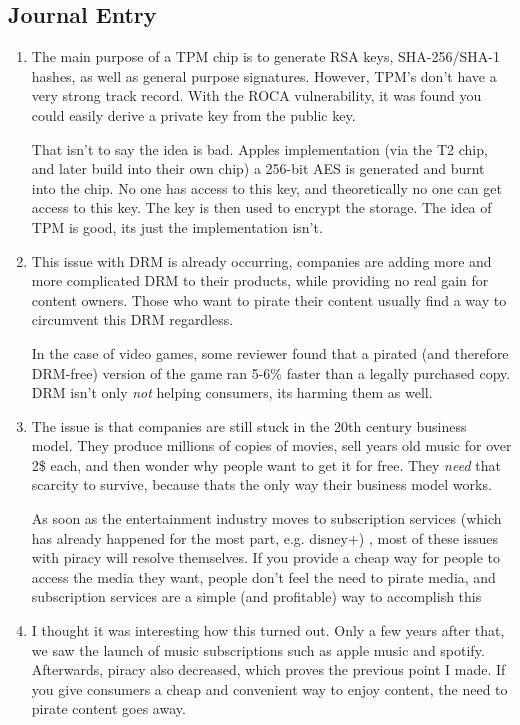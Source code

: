 \documentclass{scrartcl}
\begin{document}
\subsection{Journal Entry}
\label{sec:orgf8aa1bc}
\begin{enumerate}
\item The main purpose of a TPM chip is to generate RSA keys, SHA-256/SHA-1 hashes,
as well as general purpose signatures. However, TPM's don't have a very
strong track record. With the ROCA vulnerability, it was found you could
easily derive a private key from the public key.

That isn't to say the idea is bad. Apples implementation (via the T2 chip,
and later build into their own chip) a 256-bit AES is generated and burnt
into the chip. No one has access to this key, and theoretically no one can
get access to this key. The key is then used to encrypt the storage. The idea
of TPM is good, its just the implementation isn't.

\item This issue with DRM is already occurring, companies are adding more and more
complicated DRM to their products, while providing no real gain for content
owners. Those who want to pirate their content usually find a way to
circumvent this DRM regardless.

In the case of video games, some reviewer
found that a pirated (and therefore DRM-free) version of the game ran 5-6\%
faster than a legally purchased copy. DRM isn't only \emph{not} helping consumers,
its harming them as well.

\item The issue is that companies are still stuck in the 20th century business
model. They produce millions of copies of movies, sell years old music for
over 2\$ each, and then wonder why people want to get it for free. They \emph{need}
that scarcity to survive, because thats the only way their business model
works.

As soon as the entertainment industry moves to subscription services
(which has already happened for the most part, e.g. disney+) , most of these
issues with piracy will resolve themselves. If you provide a cheap way for
people to access the media they want, people don't feel the need to pirate
media, and subscription services are a simple (and profitable) way to
accomplish this

\item I thought it was interesting how this turned out. Only a few years after
that, we saw the launch of music subscriptions such as apple music and
spotify. Afterwards, piracy also decreased, which proves the previous point I
made. If you give consumers a cheap and convenient way to enjoy content, the
need to pirate content goes away.
\end{enumerate}
\end{document}

